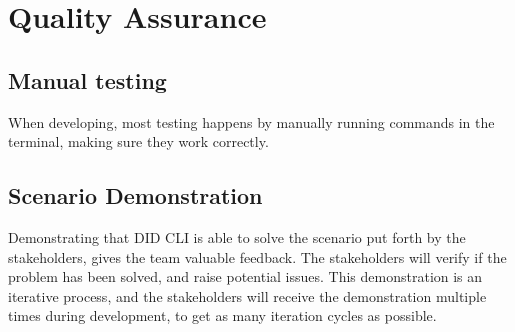 \chapter{Quality Assurance}

\section{Manual testing}

When developing, most testing happens by manually running commands in the terminal, making sure they work correctly.
 
\section{Scenario Demonstration}

Demonstrating that DID CLI is able to solve the scenario put forth by the stakeholders, gives the team valuable feedback. The stakeholders will verify if the problem has been solved, and raise potential issues. This demonstration is an iterative process, and the stakeholders will receive the demonstration multiple times during development, to get as many iteration cycles as possible.